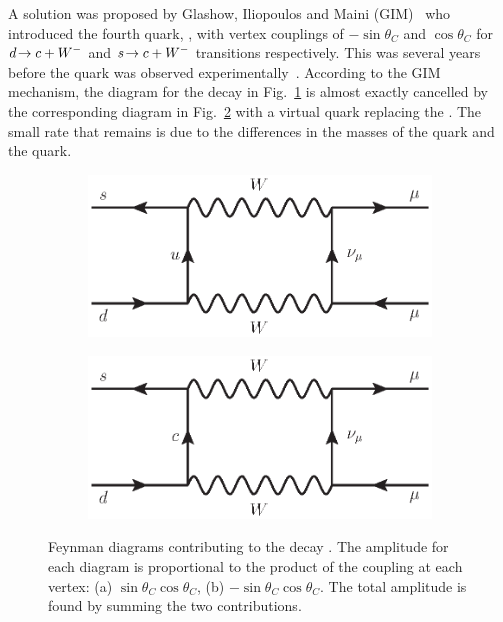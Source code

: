 A solution was proposed by Glashow, Iliopoulos and Maini (GIM)~\cite{gim} who introduced the fourth quark, \cquark, with vertex couplings of $-\sin\theta_{C}$ and $\cos\theta_{C}$ for ${d}\!\rightarrow {\ensuremath{c}}+{W^-}$ and ${s}\!\rightarrow {\ensuremath{c}}+{W^-}$ transitions respectively. This was several years before the \cquark quark was observed experimentally~\cite{jpsi-1,jpsi-2}. According to the GIM mechanism, the diagram for the decay \decay{\Kz}{\mumu} in Fig.~\ref{fig:ktomm:a} is almost exactly cancelled by the corresponding diagram in Fig.~\ref{fig:ktomm:b} with a virtual \cquark quark replacing the \uquark. The small rate that remains is due to the differences in the masses of the \uquark quark and the \cquark quark.

\begin{figure}[!tb]
\centering
\begin{subfigure}{0.49\textwidth}
\includegraphics[width=\linewidth]{figs/theory/KToMuMu_uquark.eps}
\caption{}
\label{fig:ktomm:a}
\end{subfigure}
\begin{subfigure}{0.49\textwidth}
\includegraphics[width=\linewidth]{figs/theory/KToMuMu_cquark.eps}
\caption{}
\label{fig:ktomm:b}
\end{subfigure}
\caption{Feynman diagrams contributing to the decay \decay{\Kz}{\mumu}. The amplitude for each diagram is proportional to the product of the coupling at each vertex: (a) $\sin\theta_{C}\cos\theta_{C}$, (b)  $-\sin\theta_{C}\cos\theta_{C}$. The total amplitude is found by summing the two contributions.}
\label{fig:ktomm}
\end{figure}


